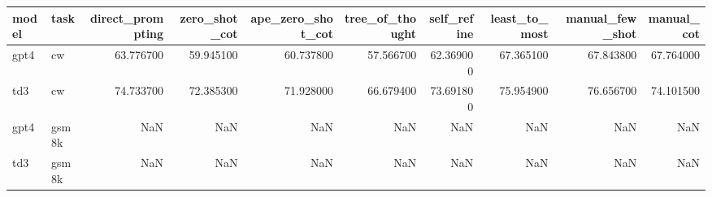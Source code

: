 \begin{tabular}{llrrrrrrrr}
\toprule
model & task & direct_prompting & zero_shot_cot & ape_zero_shot_cot & tree_of_thought & self_refine & least_to_most & manual_few_shot & manual_cot \\
\midrule
gpt4 & cw & 63.776700 & 59.945100 & 60.737800 & 57.566700 & 62.369000 & 67.365100 & 67.843800 & 67.764000 \\
td3 & cw & 74.733700 & 72.385300 & 71.928000 & 66.679400 & 73.691800 & 75.954900 & 76.656700 & 74.101500 \\
gpt4 & gsm8k & NaN & NaN & NaN & NaN & NaN & NaN & NaN & NaN \\
td3 & gsm8k & NaN & NaN & NaN & NaN & NaN & NaN & NaN & NaN \\
\bottomrule
\end{tabular}
